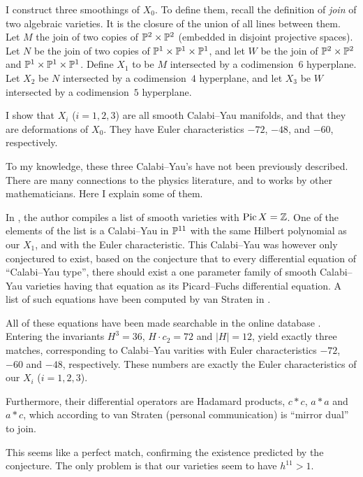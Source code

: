 I construct three smoothings of $X_0$. To define them, recall the definition of \emph{join} of two algebraic varieties. It is the closure of the union of all lines between them. Let $M$ the join of two copies of $\P^2 \times \P^2$ (embedded in disjoint projective spaces). Let $N$ be the join of two copies of $\P^1 \times \P^1 \times \P^1$, and let $W$ be the join of $\P^2 \times \P^2$ and $\P^1 \times \P^1 \times \P^1$. Define $X_1$ to be $M$ intersected by a codimension~$6$ hyperplane. Let $X_2$ be $N$ intersected by a codimension~$4$ hyperplane, and let $X_3$ be $W$ intersected by a codimension~$5$ hyperplane. 

I show that $X_i$ ($i=1,2,3$) are all smooth Calabi--Yau manifolds, and that they are deformations of $X_0$. They have Euler characteristics $-72$, $-48$, and $-60$, respectively. 

To my knowledge, these three Calabi--Yau's have not been previously described. There are many connections to the physics literature, and to works by other mathematicians. Here I explain some of them.

In \cite{kapustka_delpezzo}, the author compiles a list of smooth \CY varieties with $\Pic X = \Z$. One of the elements of the list is a Calabi--Yau in $\P^{11}$ with the same Hilbert polynomial as our $X_1$, and with the Euler characteristic. This Calabi--Yau was however only conjectured to exist, based on the conjecture that to every differential equation of ``Calabi--Yau type'', there should exist a one parameter family of smooth Calabi--Yau varieties having that equation as its Picard--Fuchs differential equation. A list of such equations have been computed by van Straten in \cite{monodromy_straten}.

All of these equations have been made searchable in the online database \cite{cy_database}. Entering the invariants $H^3=36$, $H \cdot c_2 = 72$ and $|H|=12$, yield exactly three matches, corresponding to Calabi--Yau varities with Euler characteristics $-72$, $-60$ and $-48$, respectively. These numbers are exactly the Euler characteristics of our $X_i$ ($i=1,2,3$).

Furthermore, their differential operators are Hadamard products, $c \ast c$, $a \ast a$ and $a \ast c$, which according to van Straten (personal communication) is ``mirror dual'' to join.

This seems like a perfect match, confirming the existence predicted by the conjecture. The only problem is that our varieties seem to have $h^{11} > 1$.

